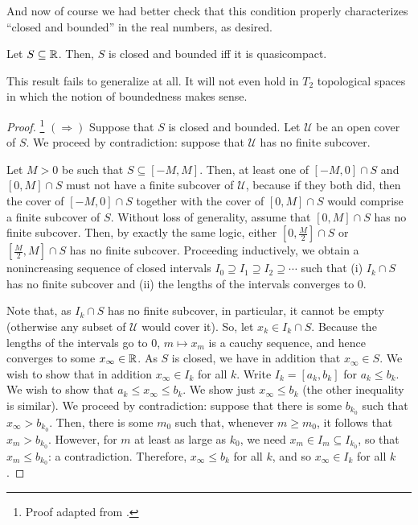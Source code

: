 And now of course we had better check that this condition properly characterizes ``closed and bounded'' in the real numbers, as desired.
\begin{thm}\label{HeineBorelTheorem}
Let $S\subseteq \mathbb{R}$.  Then, $S$ is closed and bounded iff it is quasicompact.
\begin{savenotes}
\begin{rmk}
This result fails to generalize at all.  It will not even hold in $T_2$ topological spaces in which the notion of boundedness makes sense.
\end{rmk}
\begin{proof}\footnote{Proof adapted from \cite[pg.~87--89]{Abbott}.}
$(\Rightarrow )$
Suppose that $S$ is closed and bounded.  Let $\mathcal{U}$ be an open cover of $S$.  We proceed by contradiction:  suppose that $\mathcal{U}$ has no finite subcover.

Let $M>0$ be such that $S\subseteq [-M,M]$.  Then, at least one of $[-M,0]\cap S$ and $[0,M]\cap S$ must not have a finite subcover of $\mathcal{U}$, because if they both did, then the cover of $[-M,0]\cap S$ together with the cover of $[0,M]\cap S$ would comprise a finite subcover of $S$.  Without loss of generality, assume that $[0,M]\cap S$ has no finite subcover.  Then, by exactly the same logic, either $[0,\frac{M}{2}]\cap S$ or $[\frac{M}{2},M]\cap S$ has no finite subcover.  Proceeding inductively, we obtain a nonincreasing sequence of closed intervals $I_0\supseteq I_1\supseteq I_2\supseteq \cdots$ such that (i) $I_k\cap S$ has no finite subcover and (ii) the lengths of the intervals converges to $0$.

Note that, as $I_k\cap S$ has no finite subcover, in particular, it cannot be empty (otherwise any subset of $\mathcal{U}$ would cover it).  So, let $x_k\in I_k\cap S$.  Because the lengths of the intervals go to $0$, $m\mapsto x_m$ is a cauchy sequence, and hence converges to some $x_\infty \in \mathbb{R}$.  As $S$ is closed, we have in addition that $x_\infty \in S$.  We wish to show that in addition $x_\infty \in I_k$ for all $k$.  Write $I_k=[a_k,b_k]$ for $a_k\leq b_k$.  We wish to show that $a_k\leq x_\infty \leq b_k$.  We show just $x_\infty \leq b_k$ (the other inequality is similar).  We proceed by contradiction:  suppose that there is some $b_{k_0}$ such that $x_\infty >b_{k_0}$.  Then, there is some $m_0$ such that, whenever $m\geq m_0$, it follows that $x_m>b_{k_0}$.  However, for $m$ at least as large as $k_0$, we need $x_m\in I_m\subseteq I_{k_0}$, so that $x_m\leq b_{k_0}$:  a contradiction.  Therefore, $x_\infty \leq b_k$ for all $k$, and so $x_\infty \in I_k$ for all $k$.


\end{proof}
\end{savenotes}
\end{thm}
